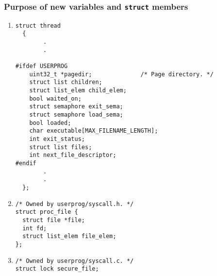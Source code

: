 \documentclass{article}
\renewcommand{\_}{\char`_}
\begin{document}
\subsubsection{Purpose of new variables and \texttt{struct} members}
\begin{enumerate}

\item \begin{lstlisting}
struct thread
  {
		.
		.
		
#ifdef USERPROG
    uint32_t *pagedir;              /* Page directory. */
    struct list children;
    struct list_elem child_elem;  
    bool waited_on;        
    struct semaphore exit_sema;  
    struct semaphore load_sema;  
    bool loaded;
    char executable[MAX_FILENAME_LENGTH]; 
    int exit_status;
    struct list files;        
    int next_file_descriptor;  
#endif
		.
		.
  };
\end{lstlisting}

\item \begin{lstlisting}
/* Owned by userprog/syscall.h. */
struct proc_file {
  struct file *file;
  int fd;
  struct list_elem file_elem;
};
\end{lstlisting}

\item \begin{lstlisting}
/* Owned by userprog/syscall.c. */
struct lock secure_file;
\end{lstlisting}

\end{enumerate}
\end{document}
